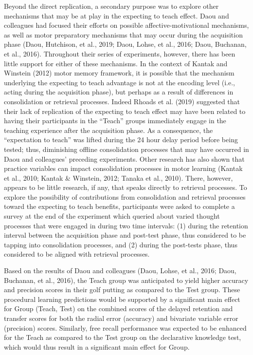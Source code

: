 \documentclass[
  english,
  man,floatsintext]{apa7}
\begin{document}
Beyond the direct replication, a secondary purpose was to explore other mechanisms that may be at play in the expecting to teach effect. Daou and colleagues had focused their efforts on possible affective-motivational mechanisms, as well as motor preparatory mechanisms that may occur during the acquisition phase (Daou, Hutchison, et al., 2019; Daou, Lohse, et al., 2016; Daou, Buchanan, et al., 2016). Throughout their series of experiments, however, there has been little support for either of these mechanisms. In the context of Kantak and Winstein (2012) motor memory framework, it is possible that the mechanism underlying the expecting to teach advantage is not at the encoding level (i.e., acting during the acquisition phase), but perhaps as a result of differences in consolidation or retrieval processes. Indeed Rhoads et al. (2019) suggested that their lack of replication of the expecting to teach effect may have been related to having their participants in the ``Teach'' groups immediately engage in the teaching experience after the acquisition phase. As a consequence, the ``expectation to teach'' was lifted during the 24 hour delay period before being tested; thus, diminishing offline consolidation processes that may have occurred in Daou and colleagues' preceding experiments. Other research has also shown that practice variables can impact consolidation processes in motor learning (Kantak et al., 2010; Kantak \& Winstein, 2012; Tanaka et al., 2010). There, however, appears to be little research, if any, that speaks directly to retrieval processes. To explore the possibility of contributions from consolidation and retrieval processes toward the expecting to teach benefits, participants were asked to complete a survey at the end of the experiment which queried about varied thought processes that were engaged in during two time intervals: (1) during the retention interval between the acquisition phase and post-test phase, thus considered to be tapping into consolidation processes, and (2) during the post-tests phase, thus considered to be aligned with retrieval processes.

Based on the results of Daou and colleagues (Daou, Lohse, et al., 2016; Daou, Buchanan, et al., 2016), the Teach group was anticipated to yield higher accuracy and precision scores in their golf putting as compared to the Test group. These procedural learning predictions would be supported by a significant main effect for Group (Teach, Test) on the combined scores of the delayed retention and transfer scores for both the radial error (accuracy) and bivariate variable error (precision) scores. Similarly, free recall performance was expected to be enhanced for the Teach as compared to the Test group on the declarative knowledge test, which would thus result in a significant main effect for Group.
\end{document}
